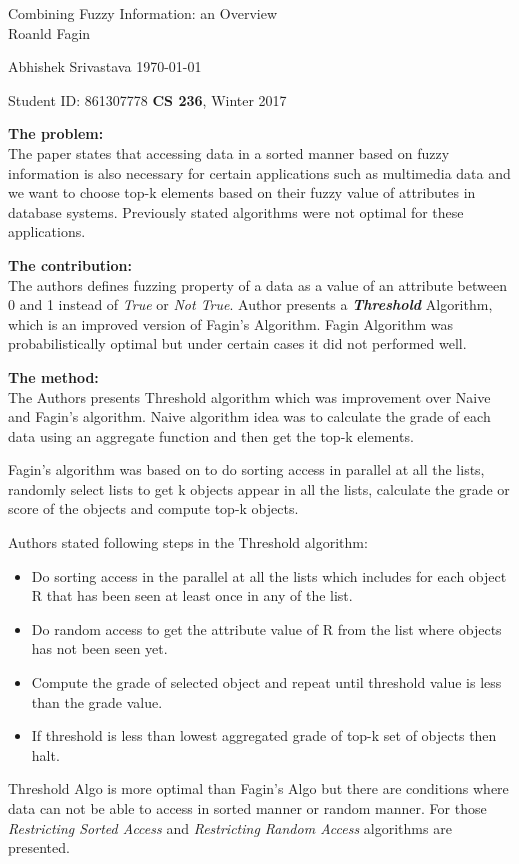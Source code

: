\documentclass[a4paper,12pt, twoside]{article}
\renewcommand{\maketitle}{%
 	\Large
 	\begin{center}
 	Combining Fuzzy Information: an Overview\\	
 	\normalsize Roanld Fagin
 	\end{center}
 
 	\Large
	Abhishek Srivastava
	\hfill
	\normalsize
	\today
 	\par
 	Student ID: 861307778
 	\hfill
 	\textbf{CS 236}, Winter 2017
 	\par 	
 	\hrulefill
 	\par
 	}
\begin{document}
\thispagestyle{empty}
	
\maketitle
\textbf{The problem:}\\
The paper states that accessing data in a sorted manner based on fuzzy information is also necessary for certain applications such as multimedia data and we want to choose top-k elements based on their fuzzy value of attributes in database systems. Previously stated algorithms were not optimal for these applications.  

\textbf{The contribution:}\\
The authors defines fuzzing property of a data as a value of an attribute between 0 and 1 instead of \emph{True} or \emph{Not True}. Author presents a \emph{\textbf{Threshold}} Algorithm, which is an improved version of Fagin's Algorithm. Fagin Algorithm was probabilistically optimal but under certain cases it did not performed well.

\textbf{The method:}\\
The Authors presents Threshold algorithm which was improvement over Naive and Fagin's algorithm. Naive algorithm idea was to calculate the grade of each data using an aggregate function and then get the  top-k elements. 

Fagin's algorithm was based on to do sorting access in parallel at all the lists, randomly select lists to get k objects appear in all the lists, calculate the grade or score of the objects and compute top-k objects.
 
Authors stated following steps in the Threshold algorithm: 
\begin{itemize}
	\item Do sorting access in the parallel at all the lists which includes for each object R that has been seen at least once in any of the list.
	\item Do random access to get the attribute value of R from the list where objects has not been seen yet. 
	\item Compute the grade of selected object and repeat until threshold value is less than the grade value. 
	\item If threshold is less than lowest aggregated grade of top-k set of objects then halt.
\end{itemize}
Threshold Algo is more optimal than Fagin's Algo but there are conditions where data can not be able to access in sorted manner or random manner. For those \emph{Restricting Sorted Access} and \emph{Restricting Random Access} algorithms are presented.
\end{document}
